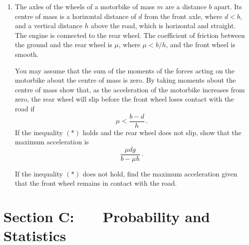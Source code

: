 \documentclass[a4, 11pt]{report}
\newlength{\qspace}
\newcounter{qnumber}
\newenvironment{question}%
 {\vspace{\qspace}
  \begin{enumerate}[\bfseries 1\quad][10]%
    \setcounter{enumi}{\value{qnumber}}%
    \item%
 }
{
  \end{enumerate}
  \filbreak
  \stepcounter{qnumber}
 }
\begin{document}
\begin{question}
The axles of the wheels of a motorbike of mass $m$
are a distance $b$ apart.  Its centre of 
mass is a horizontal distance of $d$ from the front axle, where
$d<b$, and a vertical
distance $h$ above the road, which is horizontal and straight.
The engine is connected to the rear wheel.
The coefficient of friction between the 
ground and the rear wheel is $\mu$, where $\mu<b/h$, 
and the front wheel is smooth. 

You may assume 
 that the sum of the moments of the forces acting on the motorbike
about the centre of mass is zero. By taking moments about the
centre of mass
show that, as the acceleration of the motorbike increases from zero,
the rear wheel will slip before the front wheel loses contact with the road
if
\[
\mu < \frac {b-d}h\,.
\tag{$*$}
\]
If the inequality $(*)$ holds and the rear wheel does not slip, 
show that the maximum acceleration is
\[
\frac{ \mu dg}{b-\mu h}
\,.
\]

If the inequality $(*)$ does not hold, find
the maximum acceleration 
given that
 the front wheel remains in contact 
with the road.





\end{question}

\newpage
\section*{Section C: \ \ \ Probability and Statistics}



\end{document}
